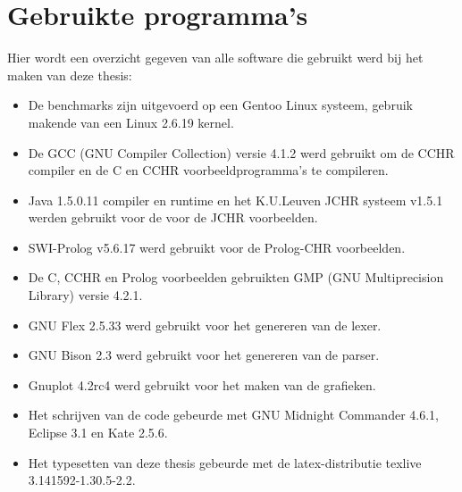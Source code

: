 \chapter{Gebruikte programma's} \label{chap:progs}

Hier wordt een overzicht gegeven van alle software die gebruikt werd bij het maken van deze thesis: \begin{itemize}
\item De benchmarks zijn uitgevoerd op een Gentoo Linux systeem, gebruik makende van een Linux 2.6.19 kernel.
\item De GCC (GNU Compiler Collection) versie 4.1.2 werd gebruikt om de CCHR compiler en de C en CCHR voorbeeldprogramma's te compileren.
\item Java 1.5.0.11 compiler en runtime en het K.U.Leuven JCHR systeem v1.5.1 werden gebruikt voor de voor de JCHR voorbeelden.
\item SWI-Prolog v5.6.17 werd gebruikt voor de Prolog-CHR voorbeelden.
\item De C, CCHR en Prolog voorbeelden gebruikten GMP (GNU Multiprecision Library) versie 4.2.1.
\item GNU Flex 2.5.33 werd gebruikt voor het genereren van de lexer.
\item GNU Bison 2.3 werd gebruikt voor het genereren van de parser.
\item Gnuplot 4.2rc4 werd gebruikt voor het maken van de grafieken.
\item Het schrijven van de code gebeurde met GNU Midnight Commander 4.6.1, Eclipse 3.1 en Kate 2.5.6.
\item Het typesetten van deze thesis gebeurde met de latex-distributie texlive 3.141592-1.30.5-2.2.
\end{itemize}
